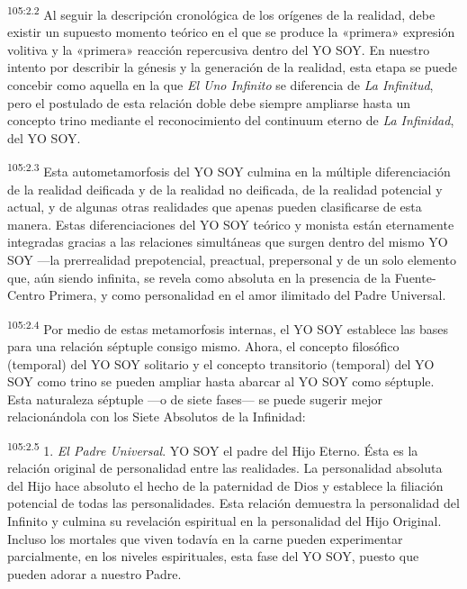 \par
\textsuperscript{105:2.2} Al seguir la descripción cronológica de los orígenes de la realidad, debe existir un supuesto momento teórico en el que se produce la «primera» expresión volitiva y la «primera» reacción repercusiva dentro del YO SOY. En nuestro intento por describir la génesis y la generación de la realidad, esta etapa se puede concebir como aquella en la que \textit{El Uno Infinito} se diferencia de \textit{La Infinitud}, pero el postulado de esta relación doble debe siempre ampliarse hasta un concepto trino mediante el reconocimiento del continuum eterno de \textit{La Infinidad}, del YO SOY.

\par
\textsuperscript{105:2.3} Esta autometamorfosis del YO SOY culmina en la múltiple diferenciación de la realidad deificada y de la realidad no deificada, de la realidad potencial y actual, y de algunas otras realidades que apenas pueden clasificarse de esta manera. Estas diferenciaciones del YO SOY teórico y monista están eternamente integradas gracias a las relaciones simultáneas que surgen dentro del mismo YO SOY ---la prerrealidad prepotencial, preactual, prepersonal y de un solo elemento que, aún siendo infinita, se revela como absoluta en la presencia de la Fuente-Centro Primera, y como personalidad en el amor ilimitado del Padre Universal.

\par
\textsuperscript{105:2.4} Por medio de estas metamorfosis internas, el YO SOY establece las bases para una relación séptuple consigo mismo. Ahora, el concepto filosófico (temporal) del YO SOY solitario y el concepto transitorio (temporal) del YO SOY como trino se pueden ampliar hasta abarcar al YO SOY como séptuple. Esta naturaleza séptuple ---o de siete fases--- se puede sugerir mejor relacionándola con los Siete Absolutos de la Infinidad:

\par
\textsuperscript{105:2.5} 1. \textit{El Padre Universal}. YO SOY el padre del Hijo Eterno. Ésta es la relación original de personalidad entre las realidades. La personalidad absoluta del Hijo hace absoluto el hecho de la paternidad de Dios y establece la filiación potencial de todas las personalidades. Esta relación demuestra la personalidad del Infinito y culmina su revelación espiritual en la personalidad del Hijo Original. Incluso los mortales que viven todavía en la carne pueden experimentar parcialmente, en los niveles espirituales, esta fase del YO SOY, puesto que pueden adorar a nuestro Padre.


